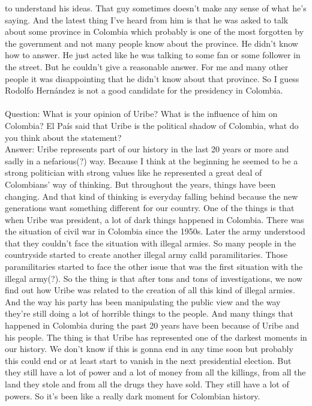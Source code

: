 \documentclass{phyasgn}\usepackage{nag}
\begin{document}
to understand his ideas. That guy sometimes doesn’t make any sense of what he’s saying. And the latest thing I’ve heard from him is that he was asked to talk about some province in Colombia which probably is one of the most forgotten by the government and not many people know about the province. He didn’t know how to answer. He just acted like he was talking to some fan or some follower in the street. But he couldn’t give a reasonable answer. For me and many other people it was disappointing that he didn’t know about that province. So I guess Rodolfo Hernández is not a good candidate for the presidency in Colombia. \\
\\
Question: What is your opinion of Uribe? What is the influence of him on Colombia? El País said that Uribe is the political shadow of Colombia, what do you think about the statement?\\
Answer: Uribe represents part of our history in the last 20 years or more and sadly in a nefarious(?) way. Because I think at the beginning he seemed to be a strong politician with strong values like he represented a great deal of Colombians’ way of thinking. But throughout the years, things have been changing. And that kind of thinking is everyday falling behind because the new generations want something different for our country. One of the things is that when Uribe was president, a lot of dark things happened in Colombia. There was the situation of civil war in Colombia since the 1950s. Later the army understood that they couldn’t face the situation with illegal armies. So many people in the countryside started to create another illegal army calld paramilitaries. Those paramilitaries started to face the other issue that was the first situation with the illegal army(?). So the thing is that after tons and tons of investigations, we now find out how Uribe was related to the creation of all this kind of illegal armies. And the way his party has been manipulating the public view and the way they’re still doing a lot of horrible things to the people. And many things that happened in Colombia during the past 20 years have been because of Uribe and his people. The thing is that Uribe has represented one of the darkest moments in our history. We don’t know if this is gonna end in any time soon but probably this could end or at least start to vanish in the next presidential election. But they still have a lot of power and a lot of money from all the killings, from all the land they stole and from all the drugs they have sold. They still have a lot of powers. So it’s been like a really dark moment for Colombian history.\\
\end{document}
